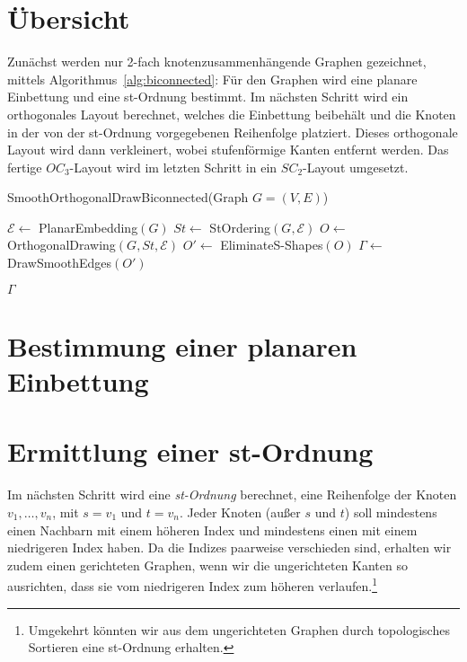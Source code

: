\documentclass[a4paper]{scrreprt}
\theoremstyle{definition}
\newcommand{\Epsilon}{\mathcal{E}}
\begin{document}
\section{Übersicht}

Zunächst werden nur 2-fach knotenzusammenhängende Graphen gezeichnet, mittels Algorithmus~\ref{alg:biconnected}: Für den Graphen wird eine planare Einbettung und eine st-Ordnung bestimmt. Im nächsten Schritt wird ein orthogonales Layout berechnet, welches die Einbettung beibehält und die Knoten in der von der st-Ordnung vorgegebenen Reihenfolge platziert. Dieses orthogonale Layout wird dann verkleinert, wobei stufenförmige Kanten entfernt werden. Das fertige $OC_3$-Layout wird im letzten Schritt in ein $SC_2$-Layout umgesetzt.

\begin{algorithm}[ht]
  \caption{SmoothOrthogonalDrawBiconnected(Graph $G = (V,E)$)}
  \label{alg:biconnected}
  
  $\Epsilon \leftarrow$ PlanarEmbedding$(G)$ \;
  $St \leftarrow$ StOrdering$(G, \Epsilon)$ \;
  $O \leftarrow$ OrthogonalDrawing$(G,St,\Epsilon)$ \;
  $O' \leftarrow$ EliminateS-Shapes$(O)$ \;
  $\Gamma \leftarrow$ DrawSmoothEdges$(O')$ \;
  
  \Return $\Gamma$
\end{algorithm}


\section{Bestimmung einer planaren Einbettung}


\section{Ermittlung einer st-Ordnung}

Im nächsten Schritt wird eine \emph{st-Ordnung} berechnet, eine Reihenfolge der Knoten $v_1, \dots, v_n$, mit $s=v_1$ und $t=v_n$. Jeder Knoten (außer $s$ und $t$) soll mindestens einen Nachbarn mit einem höheren Index und mindestens einen mit einem niedrigeren Index haben. Da die Indizes paarweise verschieden sind, erhalten wir zudem einen gerichteten Graphen, wenn wir die ungerichteten Kanten so ausrichten, dass sie vom niedrigeren Index zum höheren verlaufen.\footnote {Umgekehrt könnten wir aus dem ungerichteten Graphen durch topologisches Sortieren eine st-Ordnung erhalten.}
\end{document}
